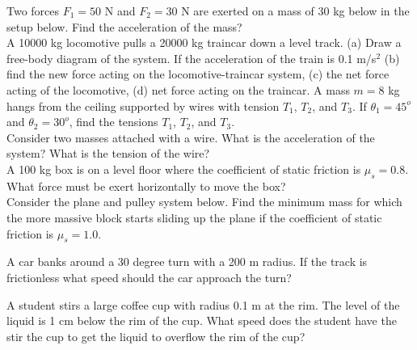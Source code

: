\documentclass[12pt]{article}
\begin{document}
\noindent Two forces $F_1 = 50$ N and $F_2 = 30$ N are exerted on a mass of 30 kg below in the setup below.  Find the acceleration of the mass? 
%
\\
\resizebox{8cm}{!}{}
\newpage
\noindent A 10000 kg locomotive pulls a 20000 kg traincar down a level track.  (a) Draw a free-body diagram of the system. If the acceleration of the train is 0.1 m/s$^2$ (b) find the new force acting on the locomotive-traincar system, (c) the net force acting of the locomotive, (d) net force acting on the traincar.
\newpage
\noindent A mass $m=8$ kg hangs from the ceiling supported by wires with tension $T_1$, $T_2$, and $T_3$.  If $\theta_1 = 45^o$ and $\theta_2=30^o$, find the tensions $T_1$, $T_2$, and $T_3$.\\
\resizebox{12cm}{!}{}
\newpage
\noindent Consider two masses attached with a wire.  What is the acceleration of the system?  What is the tension of the wire?\\
\resizebox{12cm}{!}{}
\newpage
\noindent A 100 kg box is on a level floor where the coefficient of static friction is $\mu_s = 0.8$.  What force must be exert horizontally to move the box? \\
\newpage
\noindent Consider the plane and pulley system below.   Find the minimum mass for which the more massive block starts sliding up the plane if the coefficient of static friction is $\mu_s = 1.0$. 

\resizebox{7cm}{!}{}

\newpage
\noindent A car banks around a 30 degree turn with a 200 m radius. If the track is frictionless what speed should the car approach the turn?

\newpage
\noindent A student stirs a large coffee cup with radius 0.1 m at the rim.  The level of the liquid is 1 cm below the rim of the cup.  What speed does the student have the stir the cup to get the liquid to overflow the rim of the cup?
\end{document}
